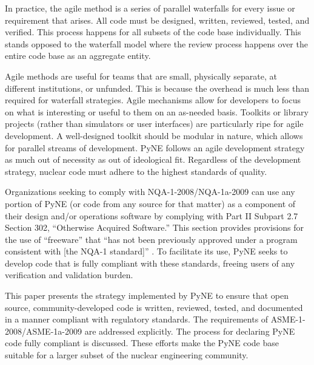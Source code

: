 \documentclass{anstrans}
\begin{document}
In practice, the agile method is a series of parallel waterfalls for every issue
or requirement that arises. All code must be designed, written, reviewed, 
tested, and verified. This process happens for all subsets of the code base
individually. This stands opposed to the waterfall model where the review 
process happens over the entire code base as an aggregate entity.

Agile methods are useful for teams that are small, physically separate, at
different institutions, or unfunded. This is because the overhead is much 
less than required for waterfall strategies.  Agile mechanisms allow for developers
to focus on what is interesting or useful to them on an as-needed basis.
Toolkits or library projects (rather than simulators or user interfaces) are 
particularly ripe for agile development. A well-designed toolkit should be 
modular in nature, which allows for parallel streams of development.  
PyNE follows an agile development strategy as much out of necessity as out of ideological fit.  Regardless of the development strategy, nuclear code
must adhere to the highest standards of quality.

Organizations seeking to comply with NQA-1-2008/NQA-1a-2009 can use any portion
of PyNE (or code from any source for that matter) as a component of their
design and/or operations software by complying with Part II Subpart 2.7 Section
302, ``Otherwise Acquired Software.'' This section provides provisions for the
use of ``freeware'' that ``has not been previously approved under a program
consistent with [the NQA-1 standard]'' \cite{add}.  To facilitate its use, PyNE
seeks to develop code that is fully compliant with these standards, freeing users of
any verification and validation burden.

This paper presents the strategy implemented by PyNE to ensure that
open source, community-developed code is written, reviewed, tested, and
documented in a manner compliant with regulatory standards. The requirements of
ASME-1-2008/ASME-1a-2009 are addressed explicitly. The process for declaring
PyNE code fully compliant is discussed. These efforts make the PyNE code base suitable
for a larger subset of the nuclear engineering community.
\end{document}
